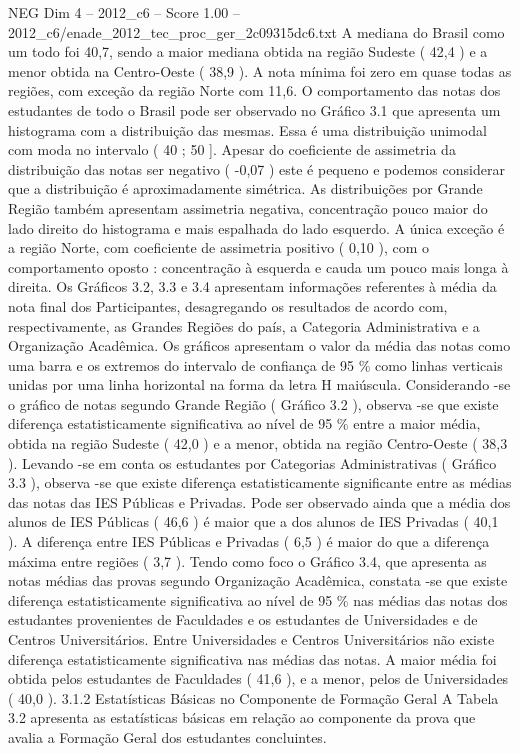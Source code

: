 \begin{textsample}{NEG Dim 4 – 2012\_c6 – Score 1.00 – 2012\_c6/enade\_2012\_tec\_proc\_ger\_2c09315dc6.txt}
A mediana do Brasil como um todo foi 40,7, sendo a maior mediana obtida na região Sudeste ( 42,4 ) e a menor obtida na Centro-Oeste ( 38,9 ).
A nota mínima foi zero em quase todas as regiões, com exceção da região Norte com 11,6.
O comportamento das notas dos estudantes de todo o Brasil pode ser observado no Gráfico 3.1 que apresenta um histograma com a distribuição das mesmas.
Essa é uma distribuição unimodal com moda no intervalo ( 40 ; 50 ].
Apesar do coeficiente de assimetria da distribuição das notas ser negativo ( -0,07 ) este é pequeno e podemos considerar que a distribuição é aproximadamente simétrica.
As distribuições por Grande Região também apresentam assimetria negativa, concentração pouco maior do lado direito do histograma e mais espalhada do lado esquerdo.
A única exceção é a região Norte, com coeficiente de assimetria positivo ( 0,10 ), com o comportamento oposto : concentração à esquerda e cauda um pouco mais longa à direita.
Os Gráficos 3.2, 3.3 e 3.4 apresentam informações referentes à média da nota final dos Participantes, desagregando os resultados de acordo com, respectivamente, as Grandes Regiões do país, a Categoria Administrativa e a Organização Acadêmica.
Os gráficos apresentam o valor da média das notas como uma barra e os extremos do intervalo de confiança de 95 \% como linhas verticais unidas por uma linha horizontal na forma da letra H maiúscula.
Considerando -se o gráfico de notas segundo Grande Região ( Gráfico 3.2 ), observa -se que existe diferença estatisticamente significativa ao nível de 95 \% entre a maior média, obtida na região Sudeste ( 42,0 ) e a menor, obtida na região Centro-Oeste ( 38,3 ).
Levando -se em conta os estudantes por Categorias Administrativas ( Gráfico 3.3 ), observa -se que existe diferença estatisticamente significante entre as médias das notas das IES Públicas e Privadas.
Pode ser observado ainda que a média dos alunos de IES Públicas ( 46,6 ) é maior que a dos alunos de IES Privadas ( 40,1 ).
A diferença entre IES Públicas e Privadas ( 6,5 ) é maior do que a diferença máxima entre regiões ( 3,7 ).
Tendo como foco o Gráfico 3.4, que apresenta as notas médias das provas segundo Organização Acadêmica, constata -se que existe diferença estatisticamente significativa ao nível de 95 \% nas médias das notas dos estudantes provenientes de Faculdades e os estudantes de Universidades e de Centros Universitários.
Entre Universidades e Centros Universitários não existe diferença estatisticamente significativa nas médias das notas.
A maior média foi obtida pelos estudantes de Faculdades ( 41,6 ), e a menor, pelos de Universidades ( 40,0 ). 3.1.2 Estatísticas Básicas no Componente de Formação Geral A Tabela 3.2 apresenta as estatísticas básicas em relação ao componente da prova que avalia a Formação Geral dos estudantes concluintes.

\end{textsample}

